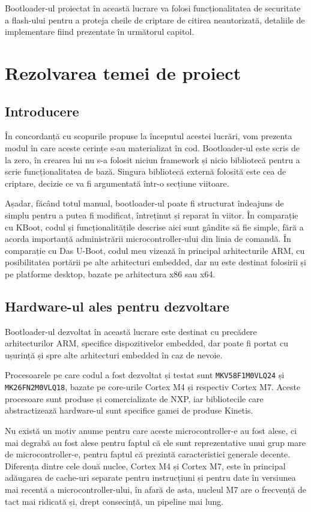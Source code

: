 \documentclass[12pt,a4paper,titlepage]{report}
\begin{document}
Bootloader-ul proiectat în această lucrare va folosi funcționalitatea de securitate a flash-ului pentru a proteja cheile de criptare de citirea neautorizată, detaliile de implementare fiind prezentate în următorul capitol.

\newpage
\chapter{Rezolvarea temei de proiect}
\section{Introducere}

În concordanță cu scopurile propuse la începutul acestei lucrări, vom prezenta modul în care aceste cerințe s-au materializat în cod. Bootloader-ul este scris de la zero, în crearea lui nu s-a folosit niciun framework și nicio bibliotecă pentru a scrie funcționalitatea de bază. Singura bibliotecă externă folosită este cea de criptare, decizie ce va fi argumentată într-o secțiune viitoare.

Așadar, făcând totul manual, bootloader-ul poate fi structurat îndeajuns de simplu pentru a putea fi modificat, întreținut și reparat în viitor. În comparație cu KBoot, codul și funcționalitățile descrise aici sunt gândite să fie simple, fără a acorda importanță administrării microcontroller-ului din linia de comandă. În comparație cu Das U-Boot, codul meu vizează în principal arhitecturile ARM, cu posibilitatea portării pe alte arhitecturi embedded, dar nu este destinat folosirii și pe platforme desktop, bazate pe arhitectura x86 sau x64.

\section{Hardware-ul ales pentru dezvoltare}

Bootloader-ul dezvoltat în această lucrare este destinat cu precădere arhitecturilor ARM, specifice dispozitivelor embedded, dar poate fi portat cu ușurință și spre alte arhitecturi embedded în caz de nevoie.

Procesoarele pe care codul a fost dezvoltat și testat sunt \texttt{MKV58F1M0VLQ24} și \texttt{MK26FN2M0VLQ18}, bazate pe core-urile Cortex M4 și respectiv Cortex M7. Aceste procesoare sunt produse și comercializate de NXP, iar bibliotecile care abstractizează hardware-ul sunt specifice gamei de produse Kinetis.

Nu există un motiv anume pentru care aceste microcontroller-e au fost alese, ci mai degrabă au fost alese pentru faptul că ele sunt reprezentative unui grup mare de microcontroller-e, pentru faptul că prezintă caracteristici generale decente.
Diferența dintre cele două nuclee, Cortex M4 și Cortex M7, este în principal adăugarea de cache-uri separate pentru instrucțiuni și pentru date în versiunea mai recentă a microcontroller-ului, în afară de asta, nucleul M7 are o frecvență de tact mai ridicată și, drept consecință, un pipeline mai lung. \cite{cortexM7} \cite{cortexM4}
\end{document}
